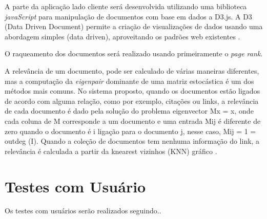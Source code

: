 A parte da aplicação lado cliente será desenvolvida utilizando uma biblioteca \textit{javaScript} para manipulação de documentos com base em dados a D3.js. A D3 (Data Driven Document) permite a criação de visualizações de dados usando uma abordagem simples (data driven), aproveitando os padrões web existentes \cite{zhu2013data}.

O raqueamento dos documentos será realizado usando primeiramente o \textit{page rank}.
 

A relevância de um documento, pode ser calculado de várias maneiras diferentes, mas a computação da \textit{eigenpair} dominante de uma matriz estocástica é um dos métodos mais comuns. No sistema proposto, quando os documentos estão ligados de acordo com alguma relação, como por exemplo, citações ou links, a relevância de cada documento é dado pela solução do problema eigenvector Mx = x, onde cada coluna de M corresponde a um documento e uma entrada Mij é diferente de zero quando o documento é i ligação para o documento j, nesse caso, Mij = 1 = outdeg (I). Quando a coleção de documentos tem nenhuma informação do link, a relevância é calculada a partir da knearest vizinhos (KNN) gráfico \cite{pagliosa2013mist}.

\section{Testes com Usuário}

Os testes com usuários serão realizados seguindo..






